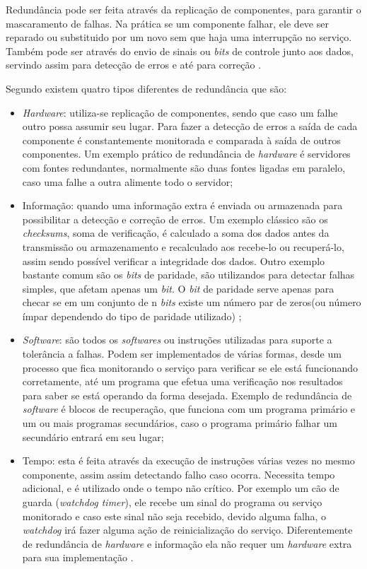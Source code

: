 Redundância pode ser feita através da replicação de componentes, para garantir o mascaramento de falhas.
Na prática se um componente falhar, ele deve ser reparado ou substituido por um novo sem que haja uma interrupção no serviço.
Também pode ser através do envio de sinais ou \textit{bits} de controle junto aos dados, 
servindo assim para detecção de erros e até para correção \cite{weber2002}.

Segundo \cite{norvag2000} existem quatro tipos diferentes de redundância que são:
\begin{itemize}
 \item \textit{Hardware}: utiliza-se replicação de componentes, sendo que caso um falhe outro possa assumir seu lugar. 
 Para fazer a detecção de erros a saída de cada componente é constantemente monitorada e comparada à saída de outros componentes.
 Um exemplo prático de redundância de \textit{hardware} é servidores com fontes redundantes, normalmente são duas fontes ligadas em paralelo, 
 caso uma falhe a outra alimente todo o servidor;
 \item Informação: quando uma informação extra é enviada ou armazenada para possibilitar a detecção e correção de erros.
 Um exemplo clássico são os \textit{checksums}, soma de verificação, é calculado a soma dos dados antes da transmissão ou armazenamento 
 e recalculado aos recebe-lo ou recuperá-lo, assim sendo possível verificar a integridade dos dados. Outro exemplo bastante comum são os 
 \textit{bits} de paridade, são utilizandos para detectar falhas simples, que afetam apenas um \textit{bit}. O \textit{bit} de paridade 
 serve apenas para checar se em um conjunto de n \textit{bits} existe um número par de zeros(ou número ímpar dependendo do tipo de paridade 
 utilizado) \cite{weber2002};
 \item \textit{Software}: são todos os \textit{softwares} ou instruções utilizadas para suporte a tolerância a falhas. Podem ser implementados
 de várias formas, desde um processo que fica monitorando o serviço para verificar se ele está funcionando corretamente, até um programa
 que efetua uma verificação nos resultados para saber se está operando da forma desejada. Exemplo de redundância de \textit{software} é 
 blocos de recuperação, que funciona com um programa primário e um ou mais programas secundários, caso o programa primário falhar um secundário
 entrará em seu lugar;
 \item Tempo: esta é feita através da execução de instruções várias vezes no mesmo componente, assim assim detectando falho caso ocorra.
 Necessita tempo adicional, e é utilizado onde o tempo não crítico. Por exemplo um cão de guarda (\textit{watchdog timer}), ele
 recebe um sinal do programa ou serviço monitorado e caso este sinal não seja recebido, devido alguma falha, o \textit{watchdog} irá fazer 
 alguma ação de reinicialização do serviço.
 Diferentemente de redundância de \textit{hardware} e informação ela não requer um \textit{hardware} extra para sua implementação \cite{costa2009}.
\end{itemize}

